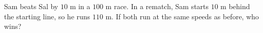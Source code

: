 Sam beats Sal by $10$ m in a $100$ m race. In a rematch, Sam starts $10$ m behind the starting line, so he runs $110$ m. If both run at the same speeds as before, who wins?
